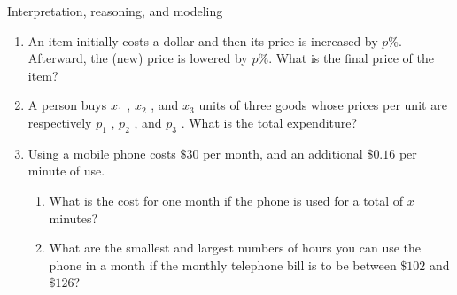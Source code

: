 \documentclass[9pt]{beamer}
\begin{document}
\begin{frame}{Interpretation, reasoning, and modeling}

    \begin{enumerate}[leftmargin = 0.5cm, label = \arabic*., rightmargin = 0.2cm]

        \item An item initially costs a dollar and then its price is increased by $p\%$. Afterward, the (new) price is lowered by $p\%$. What is the final price of the item?
        
        \item A person buys $x_1$ , $x_2$ , and $x_3$ units of three goods whose prices per unit are respectively $p_1$ , $p_2$ , and $p_3$ . What is the total expenditure?
        
        \item Using a mobile phone costs $\$30$ per month, and an additional $\$0.16$ per minute of use.

        \begin{enumerate}[leftmargin = 0.5cm, label = (\alph*), rightmargin = 0.2cm]
            \item What is the cost for one month if the phone is used for a total of $x$ minutes?
            \item What are the smallest and largest numbers of hours you can use the phone in a month if the monthly telephone bill is to be between $\$102$ and $\$126$?
        \end{enumerate}
        
    \end{enumerate}
    
\end{frame}
\end{document}

